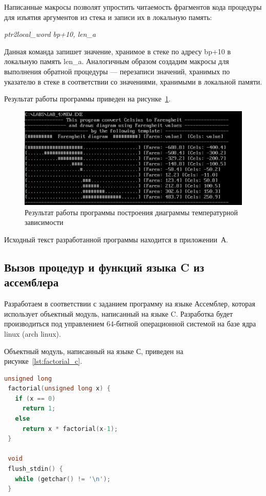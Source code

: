 Написанные макросы позволят упростить читаемость фрагментов кода процедуры
для изъятия аргументов из стека и записи их в локальную память:

\textit{ptr2local\_word bp+10, len\_a}

Данная команда запишет значение, хранимое в стеке по адресу bp+10 в локальную
память len\_a. Аналогичным образом создадим макросы для выполнения обратной
процедуры --- перезаписи значений, хранимых по указателю в стеке в соответствии
со значениями, хранимыми в локальной памяти.

Результат работы программы приведен на рисунке~\ref{pic:part_1}.

\begin{figure}[h!]
  \centering
  \includegraphics[width=0.8\linewidth]{pic/part_1}
  \caption{Результат работы программы построения диаграммы температурной зависимости}
  \label{pic:part_1}
\end{figure}

\vspace{-0.4\baselineskip}

Исходный текст разработанной программы находится в приложении~А.

\subsection{Вызов процедур и функций языка C из ассемблера}

Разработаем в соответствии с заданием программу на языке Ассемблер, 
которая использует объектный модуль, написанный на языке C.
Разработка будет производиться под управлением 64-битной операционной системой 
на базе ядра linux (arch linux).

Объектный модуль, написанный на языке С, приведен на рисунке~\ref{lst:factorial_c}.

\begin{lstlisting}[caption=Исходный текст модуля на языке C,
label=lst:factorial_c,language={C},basicstyle=\scriptsize\ttfamily]
 unsigned long
 factorial(unsigned long x) {
   if (x == 0)
     return 1;
   else
     return x * factorial(x-1);
 }
 
 void
 flush_stdin() {
   while (getchar() != '\n');
 }
\end{lstlisting}

